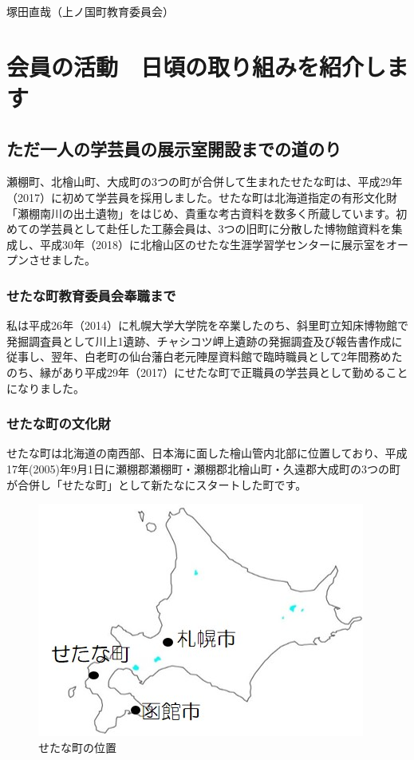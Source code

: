 \documentclass[a4j,11pt,twocolumn,openany]{jsbook}
\begin{document}
\begin{flushright}
	塚田直哉（上ノ国町教育委員会）
\end{flushright}

\chapter{会員の活動　日頃の取り組みを紹介します}

\section{ただ一人の学芸員の展示室開設までの道のり}
瀬棚町、北檜山町、大成町の3つの町が合併して生まれたせたな町は、平成29年（2017）に初めて学芸員を採用しました。せたな町は北海道指定の有形文化財「瀬棚南川の出土遺物」をはじめ、貴重な考古資料を数多く所蔵しています。初めての学芸員として赴任した工藤会員は、3つの旧町に分散した博物館資料を集成し、平成30年（2018）に北檜山区のせたな生涯学習学センターに展示室をオープンさせました。

\subsection{せたな町教育委員会奉職まで}
私は平成26年（2014）に札幌大学大学院を卒業したのち、斜里町立知床博物館で発掘調査員として川上1遺跡、チャシコツ岬上遺跡の発掘調査及び報告書作成に従事し、翌年、白老町の仙台藩白老元陣屋資料館で臨時職員として2年間務めたのち、縁があり平成29年（2017）にせたな町で正職員の学芸員として勤めることになりました。

\subsection{せたな町の文化財}

せたな町は北海道の南西部、日本海に面した檜山管内北部に位置しており、平成17年(2005)年9月1日に瀬棚郡瀬棚町・瀬棚郡北檜山町・久遠郡大成町の3つの町が合併し「せたな町」として新たなにスタートした町です。

\begin{figure}[H]
	\centering
	\includegraphics[width=0.8\linewidth]{fig/04_Kudo/fig01.jpg}
	\caption{せたな町の位置}
	\label{}
\end{figure}
\end{document}
